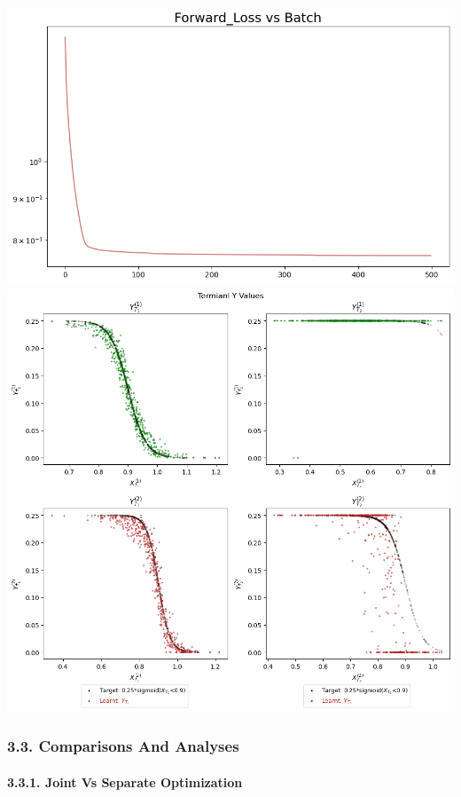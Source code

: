 \documentclass[
]{article}
\begin{document}
\includegraphics{Illustration_Diagrams/Seprt-2A2P-Sigmoid-ResExamples/Loss.png}
\includegraphics{Illustration_Diagrams/Seprt-2A2P-Sigmoid-ResExamples/sigmoid_target.png}

\hypertarget{comparisons-and-analyses}{%
\subsubsection{3.3. Comparisons And
Analyses}\label{comparisons-and-analyses}}

\hypertarget{joint-vs-separate-optimization}{%
\paragraph{3.3.1. Joint Vs Separate
Optimization}\label{joint-vs-separate-optimization}}
\end{document}
